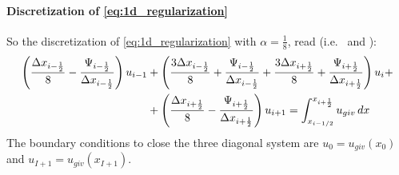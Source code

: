 \paragraph*{Discretization of \autoref{eq:1d_regularization}}
So the discretization of \autoref{eq:1d_regularization} with $\alpha = \frac{1}{8}$, read (i.e.\ \citet[eq.\ 7]{Borsboom1998} and \citet[eq.\ 6]{Borsboom2003}):
\begin{align}
\left( \frac{\Delta x_{i-\frac{1}{2}}}{8}
- \frac{\Psi_{i-\frac{1}{2}}}{\Delta x_{i-\frac{1}{2}}} \right)  u_{i-1} &
+ \left( \frac{3\Delta x_{i-\frac{1}{2}}}{8}  + \frac{\Psi_{i-\frac{1}{2}}}{{\Delta x_{i-\frac{1}{2}}}}  + \frac{3\Delta x_{i+\frac{1}{2}}}{8} +  \frac{\Psi_{i+\frac{1}{2}}}{{\Delta x_{i+\frac{1}{2}}}} \right)  u_i +
\\
& + \left(  \frac{\Delta x_{i+\frac{1}{2}}}{8} - \frac{\Psi_{i+\frac{1}{2}}}{{\Delta x_{i+\frac{1}{2}}}} \right)  u_{i+1}  = \int_{x_{i-1/2}}^{x_{i+\frac{1}{2}}} u_{giv}\, dx
\label{eq:disc_regularization}
\end{align}
The boundary conditions to close the three diagonal system are $u_0  = {u_{giv}}(x_{0})$ and $u_{I+1} = {u_{giv}}(x_{I+1})$.

